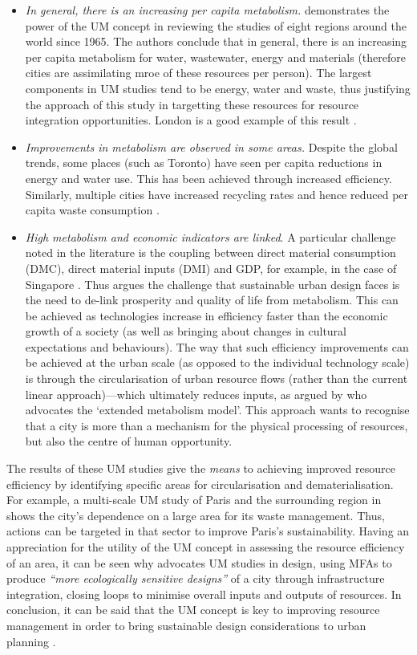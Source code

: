 \begin{itemize}
	\item \emph{In general, there is an increasing per capita metabolism.} \citet{Kennedy2008} demonstrates the power of the UM concept in reviewing the studies of eight regions around the world since 1965. The authors conclude that in general, there is an increasing per capita metabolism for water, wastewater, energy and materials (therefore cities are assimilating mroe of these resources per person). The largest components in UM studies tend to be energy, water and waste, thus justifying the approach of this study in targetting these resources for resource integration opportunities. London is a good example of this result \citep{BFF2002}.
	\item \emph{Improvements in metabolism are observed in some areas.} Despite the global trends, some places (such as Toronto) have seen per capita reductions in energy and water use. This has been achieved through increased efficiency. Similarly, multiple cities have increased recycling rates and hence reduced per capita waste consumption \citep{Kennedy2008}. 
	\item \emph{High metabolism and economic indicators are linked}. A particular challenge noted in the literature is the coupling between direct material consumption (DMC), direct material inputs (DMI) and GDP, for example, in the case of Singapore \citep{Schulz2007a}. Thus \citet{Kowalski1997} argues the challenge that sustainable urban design faces is the need to de-link prosperity and quality of life from metabolism. This can be achieved as technologies increase in efficiency faster than the economic growth of a society (as well as bringing about changes in cultural expectations and behaviours). The way that such efficiency improvements can be achieved at the urban scale (as opposed to the individual technology scale) is through the circularisation of urban resource flows (rather than the current linear approach)---which ultimately reduces inputs, as argued by \citet{Newman1999} who advocates the `extended metabolism model'. This approach wants to recognise that a city is more than a mechanism for the physical processing of resources, but also the centre of human opportunity. 
\end{itemize} 
The results of these UM studies give the \emph{means} to achieving improved resource efficiency by identifying specific areas for circularisation and dematerialisation. For example, a multi-scale UM study of Paris and the surrounding region in \citet{Barles2009} shows the city's dependence on a large area for its waste management. Thus, actions can be targeted in that sector to improve Paris's sustainability. Having an appreciation for the utility of the UM concept in assessing the resource efficiency of an area, it can be seen why \citet{Kennedy2011} advocates UM studies in design, using MFAs to produce \emph{``more ecologically sensitive designs''} of a city through infrastructure integration, closing loops to minimise overall inputs and outputs of resources. In conclusion, it can be said that the UM concept is key to improving resource management in order to bring sustainable design considerations to urban planning \citep{Agudelo-Vera2011}.
